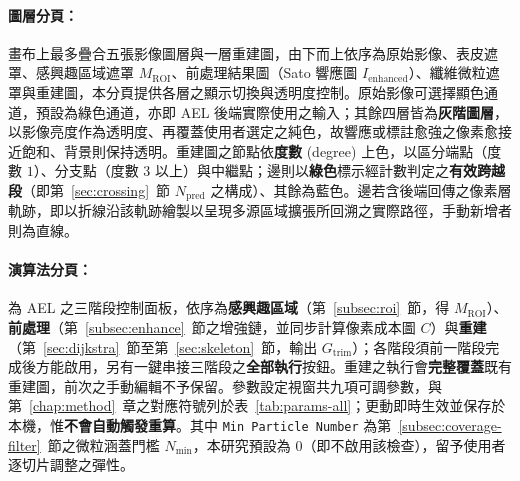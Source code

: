 \paragraph{圖層分頁：}畫布上最多疊合五張影像圖層與一層重建圖，由下而上依序為原始影像、表皮遮罩、感興趣區域遮罩 $M_{\text{ROI}}$、前處理結果圖（Sato 響應圖 $I_{\text{enhanced}}$）、纖維微粒遮罩與重建圖，本分頁提供各層之顯示切換與透明度控制。原始影像可選擇顯色通道，預設為綠色通道，亦即 AEL 後端實際使用之輸入；其餘四層皆為\textbf{灰階圖層}，以影像亮度作為透明度、再覆蓋使用者選定之純色，故響應或標註愈強之像素愈接近飽和、背景則保持透明。重建圖之節點依\textbf{度數} (degree) 上色，以區分端點（度數 $1$）、分支點（度數 $3$ 以上）與中繼點；邊則以\textbf{綠色}標示經計數判定之\textbf{有效跨越段}（即第~\ref{sec:crossing}~節 $N_{\text{pred}}$ 之構成）、其餘為藍色。邊若含後端回傳之像素層軌跡，即以折線沿該軌跡繪製以呈現多源區域擴張所回溯之實際路徑，手動新增者則為直線。

\paragraph{演算法分頁：}為 AEL 之三階段控制面板，依序為\textbf{感興趣區域}（第~\ref{subsec:roi}~節，得 $M_{\text{ROI}}$）、\textbf{前處理}（第~\ref{subsec:enhance}~節之增強鏈，並同步計算像素成本圖 $C$）與\textbf{重建}（第~\ref{sec:dijkstra}~節至第~\ref{sec:skeleton}~節，輸出 $G_{\text{trim}}$）；各階段須前一階段完成後方能啟用，另有一鍵串接三階段之\textbf{全部執行}按鈕。重建之執行會\textbf{完整覆蓋}既有重建圖，前次之手動編輯不予保留。參數設定視窗共九項可調參數，與第~\ref{chap:method}~章之對應符號列於表~\ref{tab:params-all}；更動即時生效並保存於本機，惟\textbf{不會自動觸發重算}。其中 \texttt{Min Particle Number} 為第~\ref{subsec:coverage-filter}~節之微粒涵蓋門檻 $N_{\min}$，本研究預設為 $0$（即不啟用該檢查），留予使用者逐切片調整之彈性。

